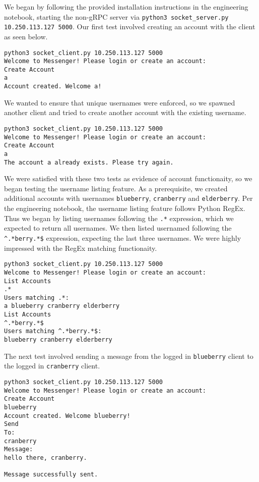 \documentclass[9pt,twocolumn,twoside]{osajnl}
\begin{document}
\noindent We began by following the provided installation instructions in the engineering notebook, starting the non-gRPC server via \texttt{python3 socket\_server.py 10.250.113.127 5000}. Our first test involved creating an account with the client as seen below.

\begin{lstlisting}[caption={Account Creation Test}]
python3 socket_client.py 10.250.113.127 5000
Welcome to Messenger! Please login or create an account:
Create Account
a
Account created. Welcome a!
\end{lstlisting}

\noindent We wanted to ensure that unique usernames were enforced, so we spawned another client and tried to create another account with the existing username.

\begin{lstlisting}[caption={Unique Username Test}]
python3 socket_client.py 10.250.113.127 5000
Welcome to Messenger! Please login or create an account:
Create Account
a
The account a already exists. Please try again.
\end{lstlisting}

\noindent We were satisfied with these two tests as evidence of account functionaity, so we began testing the username listing feature. As a prerequisite, we created additional accounts with usernames \texttt{blueberry}, \texttt{cranberry} and \texttt{elderberry}. Per the engineering notebook, the username listing feature follows Python RegEx. Thus we began by listing usernames following the \texttt{.*} expression, which we expected to return all usernames. We then listed usernamed following the \texttt{\textasciicircum.*berry.*\$} expression, expecting the last three usernames. We were highly impressed with the RegEx matching functionaity.

\begin{lstlisting}[caption={Account List and Filter Test}]
python3 socket_client.py 10.250.113.127 5000
Welcome to Messenger! Please login or create an account:
List Accounts
.*
Users matching .*:
a blueberry cranberry elderberry 
List Accounts
^.*berry.*$
Users matching ^.*berry.*$:
blueberry cranberry elderberry
\end{lstlisting}

\noindent The next test involved sending a message from the logged in \texttt{blueberry} client to the logged in \texttt{cranberry} client.

\begin{lstlisting}[caption={Send Live Message Test}]
python3 socket_client.py 10.250.113.127 5000
Welcome to Messenger! Please login or create an account:
Create Account
blueberry
Account created. Welcome blueberry!
Send
To: 
cranberry
Message: 
hello there, cranberry.

Message successfully sent.
\end{lstlisting}
\end{document}
